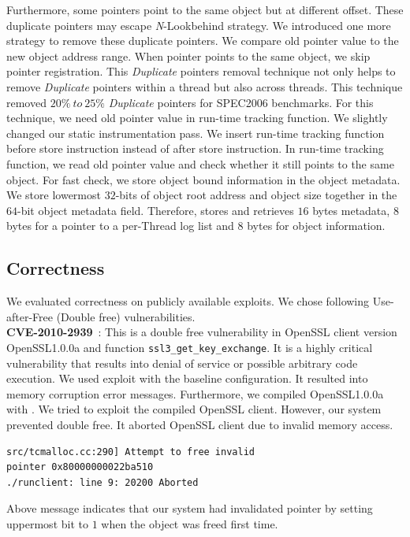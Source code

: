 Furthermore, some pointers point to the same object but at different offset. These duplicate pointers may escape \emph{N}-Lookbehind strategy. We introduced one more strategy to remove these duplicate pointers. We compare old pointer value to the new object address range. When pointer points to the same object, we skip pointer registration. This \textit{Duplicate} pointers removal technique not only helps to remove \textit{Duplicate} pointers within a thread but also across threads. This technique removed $20\%\ to\ 25\%$ \emph{Duplicate} pointers for SPEC2006 benchmarks. For this technique, we need old pointer value in run-time tracking function. We slightly changed our static instrumentation pass. We insert run-time tracking function before store instruction instead of after store instruction. In run-time tracking function, we read old pointer value and check whether it still points to the same object. For fast check, we store object bound information in the object metadata. We store lowermost $32$-bits of object root address and object size together in the $64$-bit object metadata field. Therefore, \metalloc{} stores and retrieves $16$ bytes metadata, $8$ bytes for a pointer to a per-Thread log list and $8$ bytes for object information. \\

\subsection{Correctness}
We evaluated \projectname{} correctness on publicly available exploits. We chose following Use-after-Free (Double free) vulnerabilities. \\

\textbf{CVE-2010-­2939}~\cite{OpenSSLCVE}: This is a double free vulnerability in OpenSSL client version OpenSSL1.0.0a and function \texttt{ssl3\_get\_key\_exchange}. It is a highly critical vulnerability that results into denial of service or possible arbitrary code execution. We used exploit with the baseline configuration. It resulted into memory corruption error messages. Furthermore, we compiled OpenSSL1.0.0a with \projectname{}. We tried to exploit the compiled OpenSSL client. However, our system prevented double free. It aborted OpenSSL client due to invalid memory access.
\begin{verbatim}
src/tcmalloc.cc:290] Attempt to free invalid 
pointer 0x80000000022ba510 
./runclient: line 9: 20200 Aborted 
\end{verbatim} 
Above message indicates that our system had invalidated pointer by setting uppermost bit to $1$ when the object was freed first time.
 
